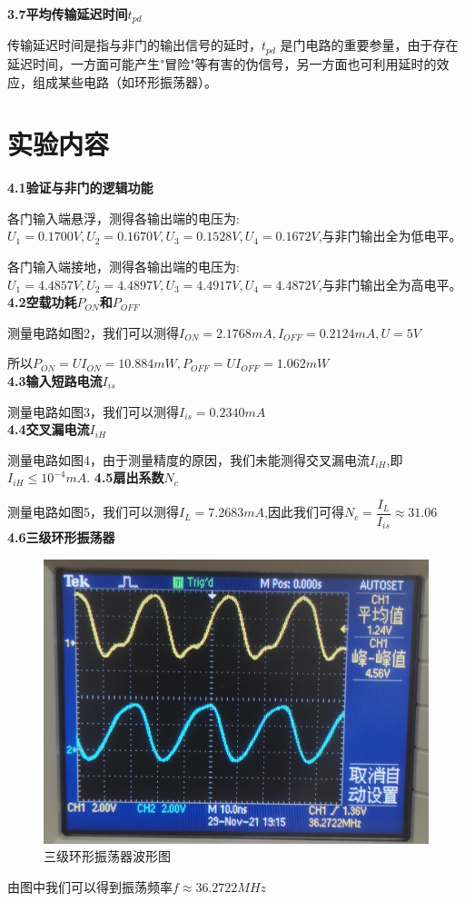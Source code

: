 \documentclass[a4 paper,12pt]{article}
\begin{document}
\noindent
\textbf{3.7平均传输延迟时间$t_{pd}$}
\par 传输延迟时间是指与非门的输出信号的延时，$t_{pd}$ 是门电路的重要参量，由于存在延迟时间，一方面可能产生"冒险"等有害的伪信号，另一方面也可利用延时的效应，组成某些电路（如环形振荡器）。
	\section{实验内容}
    \noindent
    \textbf{4.1验证与非门的逻辑功能}
    \par 各门输入端悬浮，测得各输出端的电压为:$U_{1}=0.1700V,U_{2}=0.1670V,U_{3}=0.1528V,U_{4}=0.1672V$,与非门输出全为低电平。
    \par 各门输入端接地，测得各输出端的电压为:$U_{1}=4.4857V,U_{2}=4.4897V,U_{3}=4.4917V,U_{4}=4.4872V$,与非门输出全为高电平。\\
    \noindent
    \textbf{4.2空载功耗$P_{ON}$和$P_{OFF}$}
    \par 测量电路如图2，我们可以测得$I_{ON}=2.1768mA,I_{OFF}=0.2124mA,U=5V$
    \par 所以$P_{ON}=UI_{ON}=10.884mW,P_{OFF}=UI_{OFF}=1.062mW$\\
    \noindent
    \textbf{4.3输入短路电流$I_{is}$}
    \par 测量电路如图3，我们可以测得$I_{is}=0.2340mA$\\
    \noindent
    \textbf{4.4交叉漏电流$I_{iH}$}
    \par 测量电路如图4，由于测量精度的原因，我们未能测得交叉漏电流$I_{iH}$,即$I_{iH}\le 10^{-4}mA$.
    \clearpage
    \noindent
    \textbf{4.5扇出系数$N_{c}$}
    \par 测量电路如图5，我们可以测得$I_{L}=7.2683mA$,因此我们可得$N_{c}=\dfrac{I_{L}}{I_{is}}\approx 31.06$\\
    \noindent
    \textbf{4.6三级环形振荡器}
    	\begin{figure}[H]
    		\centering
    		\hspace{2em}\includegraphics[width=.4\linewidth]{pic/1.jpg}
    		\caption{三级环形振荡器波形图
    		}
    	\end{figure}
        \par 由图中我们可以得到振荡频率$f\approx 36.2722MHz$\\
\end{document}
